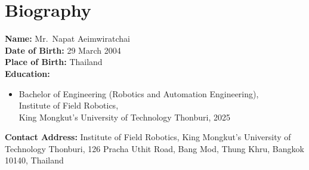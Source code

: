 \newpage
\chapter*{Biography}

\noindent\textbf{Name:} Mr.\ Napat Aeimwiratchai \\[0.3cm]
\noindent\textbf{Date of Birth:} 29 March 2004 \\[0.3cm]
\noindent\textbf{Place of Birth:} Thailand \\[0.3cm]
\noindent\textbf{Education:} \\
\begin{itemize}
    \item Bachelor of Engineering (Robotics and Automation Engineering),\\
          Institute of Field Robotics,\\
          King Mongkut's University of Technology Thonburi, 2025
\end{itemize}

\vspace{0.5cm}
\noindent\textbf{Contact Address:} Institute of Field Robotics, King Mongkut's University of Technology Thonburi, 126 Pracha Uthit Road, Bang Mod, Thung Khru, Bangkok 10140, Thailand\\
